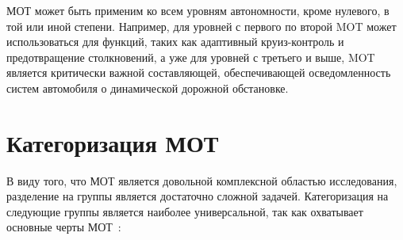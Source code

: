 МОТ может быть применим ко всем уровням автономности, кроме нулевого, в той или иной степени. Например, для уровней с первого по второй MOT может использоваться для функций, таких как адаптивный круиз-контроль и предотвращение столкновений, а уже для уровней с третьего и выше, MOT является критически важной составляющей, обеспечивающей осведомленность систем автомобиля о динамической дорожной обстановке.


\section{Категоризация МОТ}

В виду того, что МОТ является довольной комплексной областью исследования, разделение на группы является достаточно сложной задачей. Категоризация на следующие группы является наиболее универсальной, так как охватывает основные черты МОТ~\cite{Article::Luo2021}: 

